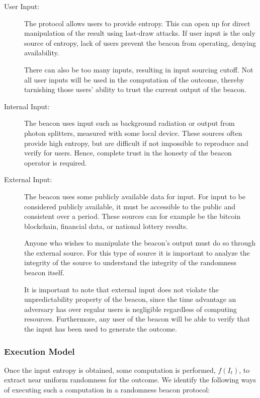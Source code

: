 \begin{description}
    \item[User Input:]
        The protocol allows users to provide entropy.
        This can open up for direct manipulation of the result using last-draw attacks.
        If user input is the only source of entropy, lack of users prevent the beacon from operating, denying availability.

        There can also be too many inputs, resulting in input sourcing cutoff. Not all user inputs will be used in the computation of the outcome, thereby tarnishing those users' ability to trust the current output of the beacon.

    \item[Internal Input:]
        The beacon uses input such as background radiation or output from photon splitters, measured with some local device.
        These sources often provide high entropy, but are difficult if not impossible to reproduce and verify for users. Hence, complete trust in the honesty of the beacon operator is required.

    \item[External Input:]
        The beacon uses some publicly available data for input. For input to be considered publicly available, it must be accessible to the public and consistent over a period.
        These sources can for example be the bitcoin blockchain, financial data, or national lottery results.

        Anyone who wishes to manipulate the beacon's output must do so through the external source.
        For this type of source it is important to analyze the integrity of the source to understand the integrity of the randomness beacon itself.

        It is important to note that external input does not violate the unpredictability property of the beacon, since the time advantage an adversary has over regular users is negligible regardless of computing resources.
        Furthermore, any user of the beacon will be able to verify that the input has been used to generate the outcome.

\end{description}

\subsubsection{Execution Model}
Once the input entropy is obtained, some computation is performed, $f(I_t)$, to extract near uniform randomness for the outcome.
We identify the following ways of executing such a computation in a randomness beacon protocol:

